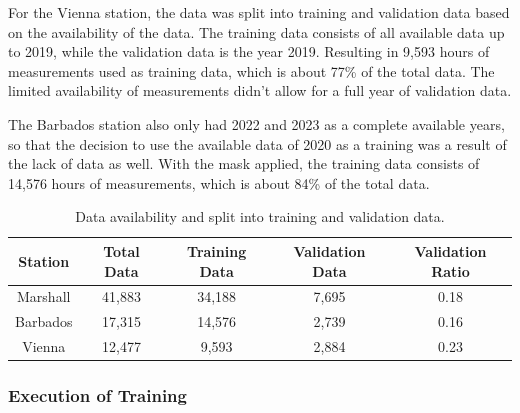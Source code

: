 For the Vienna station, the data was split into training and validation data based on the availability of the data. The training data consists of all available data up to 2019, while the validation data is the year 2019. Resulting in 9,593 hours of measurements used as training data, which is about 77\% of the total data. The limited availability of measurements didn't allow for a full year of validation data.

The Barbados station also only had 2022 and 2023 as a complete available years, so that the decision to use the available data of 2020 as a training was a result of the lack of data as well. With the mask applied, the training data consists of 14,576 hours of measurements, which is about 84\% of the total data.






\begin{table}
\centering
\begin{tabular}{|c|c|c|c|c|}
\hline
Station & Total Data & Training Data & Validation Data & Validation Ratio \\
\hline
Marshall & 41,883 & 34,188 & 7,695 & 0.18 \\
Barbados & 17,315 & 14,576 & 2,739 & 0.16 \\
Vienna & 12,477 & 9,593 & 2,884 & 0.23 \\
\hline
\end{tabular}
\caption{Data availability and split into training and validation data.}
\label{tab:data_split}
\end{table}

\subsubsection*{Execution of Training}

